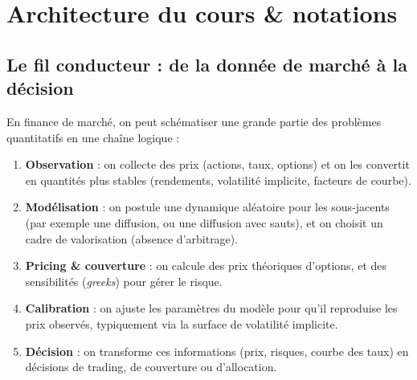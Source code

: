 \documentclass[11pt,a4paper]{report}
\newcommand{\1}{\mathbbm{1}}
\theoremstyle{definition}
\theoremstyle{plain}
\theoremstyle{remark}
\begin{document}
\tableofcontents
\listoffigures
\clearpage
{}

\chapter{Architecture du cours \& notations}
\label{chap:archi_notations}

\section{Le fil conducteur : de la donnée de marché à la décision}
\label{sec:fil_conducteur}

En finance de marché, on peut schématiser une grande partie des problèmes quantitatifs en une chaîne logique :
\begin{enumerate}[label=\alph*)]
  \item \textbf{Observation} : on collecte des prix (actions, taux, options) et on les convertit en quantités plus stables (rendements, volatilité implicite, facteurs de courbe).
  \item \textbf{Modélisation} : on postule une dynamique aléatoire pour les sous-jacents (par exemple une diffusion, ou une diffusion avec sauts), et on choisit un cadre de valorisation (absence d'arbitrage).
  \item \textbf{Pricing \& couverture} : on calcule des prix théoriques d'options, et des sensibilités (\emph{greeks}) pour gérer le risque.
  \item \textbf{Calibration} : on ajuste les paramètres du modèle pour qu'il reproduise les prix observés, typiquement via la surface de volatilité implicite.
  \item \textbf{Décision} : on transforme ces informations (prix, risques, courbe des taux) en décisions de trading, de couverture ou d'allocation.
\end{enumerate}
\end{document}

